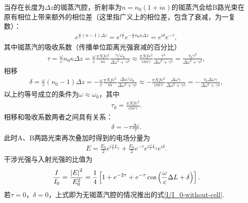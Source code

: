 \documentclass{assignment}
\begin{document}
当存在长度为$\Delta z$的铷蒸汽腔，折射率为$n=n_0(1+i\kappa)$的铷蒸汽会给B路光束在原有相位上带来额外的相位差（这里指广义上的相位差，包含了衰减，为一复数）：
\begin{align}
    e^{\frac{\omega}{c}(n-1)\Delta z}=e^{i\frac{\omega}{c}}e^{-\frac{\omega}{c}n_0\kappa\Delta z}=e^{i\delta}e^{-\tau},
\end{align}
其中铷蒸汽的吸收系数（传播单位距离光强衰减的百分比）
\begin{align}
    \tau=\frac{\omega}{c}n_0\kappa\Delta z=\frac{\omega}{c}\frac{\pi Nfe^2}{m}\frac{\gamma/\omega_0}{\Delta\omega^2+\gamma^2}\approx\frac{\pi Nfe^2}{cm\gamma}\frac{\gamma^2}{\Delta\omega^2+\gamma^2}=\frac{\tau_0\gamma^2}{\Delta\omega^2+\gamma^2},
\end{align}
相移
\begin{align}
    \delta=\frac{\omega}{c}(n_0-1)\Delta z=-\frac{\omega}{c}\frac{\pi Nfe^2}{m}\frac{\Delta\omega/\omega_0}{\Delta\omega^2+\gamma^2}\approx-\frac{\pi Nfe^2}{cm\gamma}\frac{\Delta\omega\gamma}{\Delta\omega^2+\gamma^2}=-\frac{\tau_0\Delta\omega\gamma}{\Delta\omega^2+\gamma^2},
\end{align}
以上约等号成立的条件为$\omega\approx\omega_0$，其中
\begin{align}
    \tau_0=\frac{\pi Nfe^2}{cm\gamma}.
\end{align}
相移和吸收系数两者之间具有关系：
\begin{align}
    \delta=-\tau\frac{\Delta\omega}{\tau}.
\end{align}
此时A、B两路光束再次叠加时得到的电场分量为
\begin{align}
    E=\frac{E_0}{2}e^{i\frac{\omega}{c}L_1}+\frac{E_0}{2}e^{-\tau}e^{i\frac{\omega}{c}L_2}e^{i\delta}.
\end{align}
干涉光强与入射光强的比值为
\begin{align}
    \frac{I}{I_0}=\frac{\left\lvert E\right\rvert^2}{E_0^2}=\frac{1}{4}\left[1+e^{-2\tau}+e^{-\tau}\cos\left(\frac{\omega}{c}\Delta L+\delta\right)\right].
\end{align}
若$\tau=0$，$\delta=0$，上式即为无铷蒸汽腔的情况推出的式\eqref{I/I_0-without-cell}.
\end{document}
